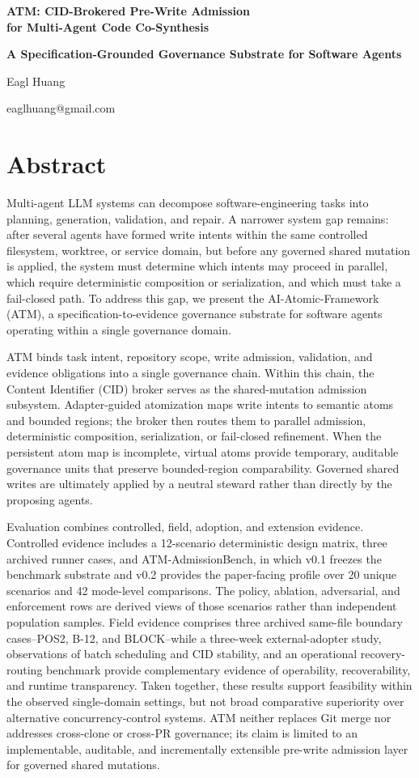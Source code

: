 \documentclass[9pt,letterpaper]{extarticle}
\makeatletter
\newcommand{\paperTitleBlock}{%
  \begin{center}
    {\fontsize{18}{22}\selectfont\bfseries
    ATM: CID-Brokered Pre-Write Admission\\
    for Multi-Agent Code Co-Synthesis\par}
    \vspace{2.5pt}
    {\fontsize{10}{12}\selectfont\bfseries
    A Specification-Grounded Governance Substrate for Software Agents\par}
    \vspace{12pt}
    {\fontsize{11}{13}\selectfont Eagl Huang\par}
    {\fontsize{10}{12}\selectfont eaglhuang@gmail.com\par}
  \end{center}
  \vspace{4pt}
}
\makeatother
\begin{document}
\paperTitleBlock

\section*{Abstract}

Multi-agent LLM systems can decompose software-engineering tasks into planning, generation, validation, and repair. A narrower system gap remains: after several agents have formed write intents within the same controlled filesystem, worktree, or service domain, but before any governed shared mutation is applied, the system must determine which intents may proceed in parallel, which require deterministic composition or serialization, and which must take a fail-closed path. To address this gap, we present the AI-Atomic-Framework (ATM), a specification-to-evidence governance substrate for software agents operating within a single governance domain.

ATM binds task intent, repository scope, write admission, validation, and evidence obligations into a single governance chain. Within this chain, the Content Identifier (CID) broker serves as the shared-mutation admission subsystem. Adapter-guided atomization maps write intents to semantic atoms and bounded regions; the broker then routes them to parallel admission, deterministic composition, serialization, or fail-closed refinement. When the persistent atom map is incomplete, virtual atoms provide temporary, auditable governance units that preserve bounded-region comparability. Governed shared writes are ultimately applied by a neutral steward rather than directly by the proposing agents.

Evaluation combines controlled, field, adoption, and extension evidence. Controlled evidence includes a 12-scenario deterministic design matrix, three archived runner cases, and ATM-AdmissionBench, in which v0.1 freezes the benchmark substrate and v0.2 provides the paper-facing profile over 20 unique scenarios and 42 mode-level comparisons. The policy, ablation, adversarial, and enforcement rows are derived views of those scenarios rather than independent population samples. Field evidence comprises three archived same-file boundary cases--POS2, B-12, and BLOCK--while a three-week external-adopter study, observations of batch scheduling and CID stability, and an operational recovery-routing benchmark provide complementary evidence of operability, recoverability, and runtime transparency. Taken together, these results support feasibility within the observed single-domain settings, but not broad comparative superiority over alternative concurrency-control systems. ATM neither replaces Git merge nor addresses cross-clone or cross-PR governance; its claim is limited to an implementable, auditable, and incrementally extensible pre-write admission layer for governed shared mutations.
\end{document}
